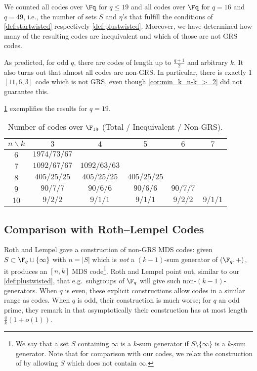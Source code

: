 \documentclass[conference,a4paper]{IEEEtran}
\begin{document}
We counted all \startw codes over $\Fq$ for $q \leq 19$ and all \plustw codes over $\Fq$ for $q = 16$ and $q = 49$, i.e., the number of sets $S$ and $\eta$'s that fulfill the conditions of \cref{def:startwisted} respectively \cref{def:plustwisted}.
Moreover, we have determined how many of the resulting codes are inequivalent and which of those are not GRS codes.

As predicted, for odd $q$, there are \startw codes of length up to $\frac{q+1}{2}$ and arbitrary $k$. It also turns out that almost all \startw codes are non-GRS.
In particular, there is exactly 1 \startw $[11,6,3]$ code which is not GRS, even though \cref{cor:min_k_n-k_>_2} did not guarantee this.


\cref{tab:star_twisted_computer_search_example} exemplifies the results for $q=19$.

\begin{table}[h]
\caption{Number of \startw codes over $\F_{19}$ (Total / Inequivalent / Non-GRS).}
\label{tab:star_twisted_computer_search_example}
\centering
\renewcommand{\arraystretch}{1.3}
\begin{tabular}{c|c|c|c|c|c}
$n\backslash k$ & $3$ & $4$ & $5$ & $6$ & $7$ \\
\hline
$6$ & $1974/73/67$ &   &  &   &     \\
$7$ & $1092/67/67$ & $1092/63/63$  &  &   &     \\
$8$ & $405/25/25$ & $405/25/25$  & $405/25/25$ &   &     \\
$9$ & $90/7/7$ & $90/6/6$  & $90/6/6$ & $90/7/7$  &     \\
$10$ & $9/2/2$ & $9/1/1$  & $9/1/1$ & $9/2/2$  & $9/1/1$
\end{tabular}
\end{table}


\subsection{Comparison with Roth--Lempel Codes}

Roth and Lempel \cite{roth_construction_1989} gave a construction of non-GRS MDS codes: given $S \subset \F_q \cup \{\infty\}$ with $n = |S|$ which is \emph{not} a $(k-1)$-sum generator of $(\F_q, +)$, it produces an $[n,k]$ MDS code\footnote{%
  We say that a set $S$ containing $\infty$ is a $k$-sum generator if $S \setminus \{\infty\}$ is a $k$-sum generator.
  Note that for comparison with our codes, we relax the construction of \cite{roth_construction_1989} by allowing $S$ which does not contain $\infty$.
  }.
Roth and Lempel point out, similar to our \cref{def:plustwisted}, that e.g.~subgroups of $\F_q$ will give such non-$(k-1)$-generators.
When $q$ is even, these explicit constructions allow codes in a similar range as \plustw codes.
When $q$ is odd, their construction is much worse; for $q$ an odd prime, they remark in \cite{roth_t-sum_1992} that asymptotically their construction has at most length $\frac q k(1 + o(1))$.
\end{document}
